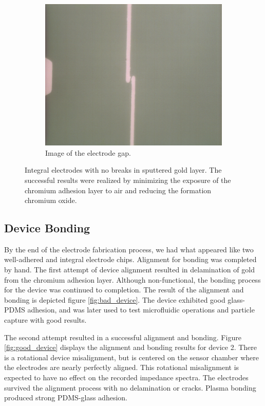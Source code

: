 \begin{figure}[h]
\begin{subfigure}[b]{0.45\textwidth}
        \includegraphics[width=\textwidth]{images/goodElectrodeCloseUp.png}
        \caption{Image of the electrode gap.}
    \end{subfigure}
    \caption{Integral electrodes with no breaks in sputtered gold layer. The successful results were realized by minimizing the exposure of the chromium adhesion layer to air and reducing the formation chromium oxide.}
    \label{fig:good_electrodes}
\end{figure}


\FloatBarrier

\subsection{Device Bonding}

\par By the end of the electrode fabrication process, we had what appeared like two well-adhered and integral electrode chips. Alignment for bonding was completed by hand. The first attempt of device alignment resulted in delamination of gold from the chromium adhesion layer. Although non-functional, the bonding process for the device was continued to completion. The result of the alignment and bonding is depicted figure \ref{fig:bad_device}. The device exhibited good glass-PDMS adhesion, and was later used to test microfluidic operations and particle capture with good results.


\par The second attempt resulted in a successful alignment and bonding. Figure \ref{fig:good_device} displays the alignment and bonding results for device 2. There is a rotational device misalignment, but is centered on the sensor chamber where the electrodes are nearly perfectly aligned. This rotational misalignment is expected to have no effect on the recorded impedance spectra. The electrodes survived the alignment process with no delamination or cracks. Plasma bonding produced  strong PDMS-glass adhesion. 

